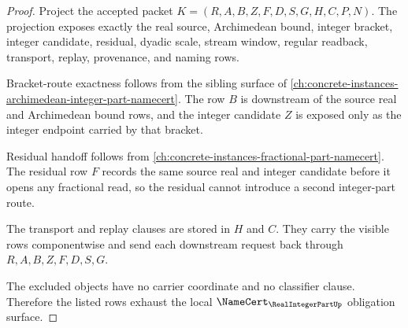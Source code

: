 \begin{proof}
Project the accepted packet $K=(R,A,B,Z,F,D,S,G,H,C,P,N)$. The projection exposes exactly the real source, Archimedean bound, integer bracket, integer candidate, residual, dyadic scale, stream window, regular readback, transport, replay, provenance, and naming rows.

Bracket-route exactness follows from the sibling surface of \autoref{ch:concrete-instances-archimedean-integer-part-namecert}. The row $B$ is downstream of the source real and Archimedean bound rows, and the integer candidate $Z$ is exposed only as the integer endpoint carried by that bracket.

Residual handoff follows from \autoref{ch:concrete-instances-fractional-part-namecert}. The residual row $F$ records the same source real and integer candidate before it opens any fractional read, so the residual cannot introduce a second integer-part route.

The transport and replay clauses are stored in $H$ and $C$. They carry the visible rows componentwise and send each downstream request back through $R,A,B,Z,F,D,S,G$.

The excluded objects have no carrier coordinate and no classifier clause. Therefore the listed rows exhaust the local $\NameCert_{\RealIntegerPartUp}$ obligation surface.
\end{proof}

